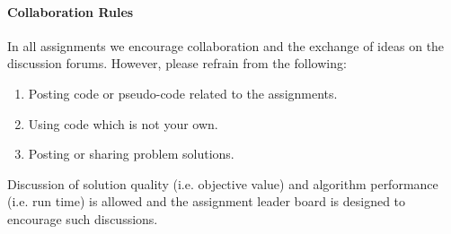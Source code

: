 \paragraph{Collaboration Rules} 

In all assignments we encourage collaboration and the exchange of ideas on the discussion forums.  However, please refrain from the following:
\begin{enumerate}
\item Posting code or pseudo-code related to the assignments.
\item Using code which is not your own.
\item Posting or sharing problem solutions.
\end{enumerate}
Discussion of solution quality (i.e. objective value) and algorithm performance (i.e. run time) is allowed and the assignment leader board is designed to encourage such discussions.
